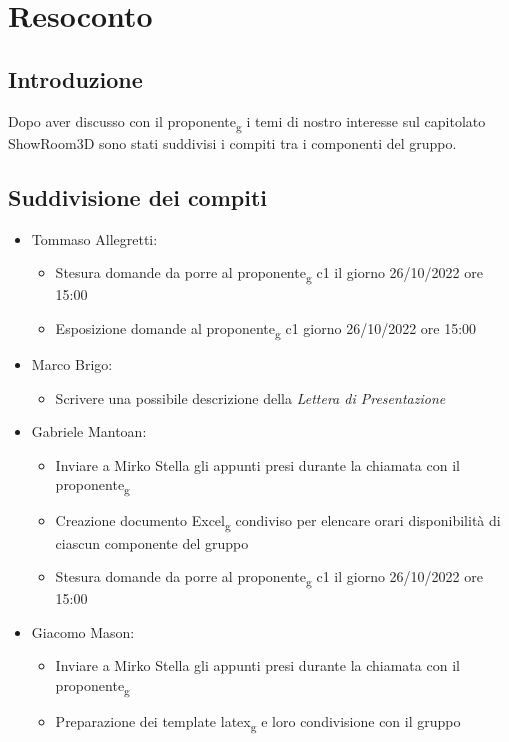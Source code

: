 \section{Resoconto}
\subsection{Introduzione}
Dopo aver discusso con il proponente\textsubscript{g} i temi di nostro interesse sul capitolato ShowRoom3D 
sono stati suddivisi i compiti tra i componenti del gruppo.
\subsection{Suddivisione dei compiti}
\begin{itemize}
    \item Tommaso Allegretti:
    \begin{itemize}
        \item Stesura domande da porre al proponente\textsubscript{g} c1 il giorno 26/10/2022 ore 15:00
        \item Esposizione domande al proponente\textsubscript{g} c1 giorno 26/10/2022 ore 15:00
    \end{itemize}
    \item Marco Brigo:
    \begin{itemize}
        \item Scrivere una possibile descrizione della \textit{Lettera di Presentazione}
    \end{itemize}
    \item Gabriele Mantoan:
    \begin{itemize}
        \item Inviare a Mirko Stella gli appunti presi durante la chiamata con il proponente\textsubscript{g}
        \item Creazione documento Excel\textsubscript{g} condiviso per elencare orari disponibilità di ciascun componente del gruppo
        \item Stesura domande da porre al proponente\textsubscript{g} c1 il giorno 26/10/2022 ore 15:00
    \end{itemize}
    \item Giacomo Mason:
    \begin{itemize}
        \item Inviare a Mirko Stella gli appunti presi durante la chiamata con il proponente\textsubscript{g}
        \item Preparazione dei template latex\textsubscript{g} e loro condivisione con il gruppo

\end{itemize}
\end{itemize}
